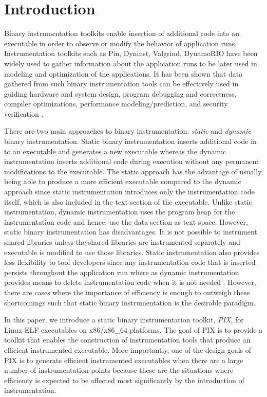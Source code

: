\section{Introduction}

Binary instrumentation toolkits enable insertion of additional code into an
executable in order to observe or modify the behavior of application runs. 
Instrumentation toolkits such as Pin\cite{luk2005pin}, Dyninst\cite{buck2000api}, 
Valgrind\cite{nethercote2007valgrind}, DynamoRIO\cite{bruening2004efficient} have been widely used to gather information about the
application runs to be later used in modeling and optimization
of the applications. It has been shown that data gathered 
from such binary instrumentation tools can be effectively used in guiding hardware and
system design, program debugging and correctness, compiler optimizations,
performance modeling/prediction, and security verification \cite{snavely2001modeling}.

There are two main approaches to binary instrumentation: \textit{static} 
and \textit{dynamic} binary instrumentation. Static binary
instrumentation inserts additional code in to an executable and generates a new
executable whereas the dynamic instrumentation inserts additional code 
during execution without any permanent modifications to the executable.
The static approach has the advantage of usually being able to produce
a more efficient executable compared to the dynamic approach
since static instrumentation introduces only the instrumentation code itself, 
which is also included in the text section of the executable. 
Unlike static instrumentation, dynamic
instrumentation uses the program heap for the instrumentation code and hence, use the data section as text space.
However, static binary instrumentation has disadvantages. It is not possible to instrument shared libraries 
unless the shared libraries are instrumented separately and executable is modified to use those libraries. 
Static instrumentation also provides less flexibility to tool developers since any instrumentation code that is
inserted persists throughout the application run where as dynamic instrumentation 
provides means to delete instrumentation code when it is not needed \cite{tikir2002efficient}.
However, there are cases where the importance of efficiency is enough to outweigh
these shortcomings \cite{carrington2006performance} such that static binary instrumentation is the
desirable paradigm. 

In this paper, we introduce a static binary instrumentation toolkit, \textit{PIX}, for Linux ELF executables on
x86/x86\_64 platforms. The goal of PIX is to provide a toolkit that enables the construction of
instrumentation tools that produce an efficient instrumented
executable. More importantly, one of the design goals of PIX is to generate efficient instrumented executables
when there are a large number of instrumentation points because these are the situations where efficiency
is expected to be affected most significantly by the introduction of instrumentation. 

